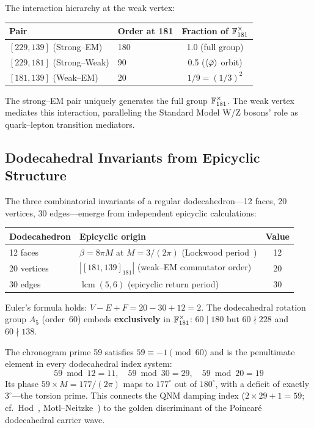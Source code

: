 The interaction hierarchy at the weak vertex:
\begin{center}
\begin{tabular}{llc}
\hline
Pair & Order at 181 & Fraction of $\mathbb{F}_{181}^{\times}$ \\
\hline
$[229, 139]$ (Strong--EM) & 180 & 1.0 (full group) \\
$[229, 181]$ (Strong--Weak) & 90 & 0.5 ($\langle\bar{\varphi}\rangle$ orbit) \\
$[181, 139]$ (Weak--EM) & 20 & $1/9 = (1/3)^2$ \\
\hline
\end{tabular}
\end{center}

The strong--EM pair uniquely generates the full group $\mathbb{F}_{181}^{\times}$. The weak vertex mediates this interaction, paralleling the Standard Model W/Z bosons' role as quark--lepton transition mediators.

\subsection{Dodecahedral Invariants from Epicyclic Structure}

The three combinatorial invariants of a regular dodecahedron---12 faces, 20 vertices, 30 edges---emerge from independent epicyclic calculations:
\begin{center}
\begin{tabular}{llc}
\hline
Dodecahedron & Epicyclic origin & Value \\
\hline
12 faces & $\beta = 8\pi M$ at $M = 3/(2\pi)$ (Lockwood period~\cite{lockwood_v11}) & 12 \\
20 vertices & $|[181,139]_{181}|$ (weak--EM commutator order) & 20 \\
30 edges & $\operatorname{lcm}(5, 6)$ (epicyclic return period) & 30 \\
\hline
\end{tabular}
\end{center}

Euler's formula holds: $V - E + F = 20 - 30 + 12 = 2$. The dodecahedral rotation group $A_5$ (order~60) embeds \textbf{exclusively} in $\mathbb{F}_{181}^{\times}$: $60 \mid 180$ but $60 \nmid 228$ and $60 \nmid 138$.

The chronogram prime 59 satisfies $59 \equiv -1 \pmod{60}$ and is the penultimate element in every dodecahedral index system:
\begin{equation}
    59 \bmod 12 = 11, \quad 59 \bmod 30 = 29, \quad 59 \bmod 20 = 19
\end{equation}
Its phase $59 \times M = 177/(2\pi)$ maps to $177^{\circ}$ out of $180^{\circ}$, with a deficit of exactly $3^{\circ}$---the torsion prime. This connects the QNM damping index ($2 \times 29 + 1 = 59$; cf.\ Hod~\cite{hod1998}, Motl--Neitzke~\cite{motl2003}) to the golden discriminant of the Poincar\'{e} dodecahedral carrier wave.

